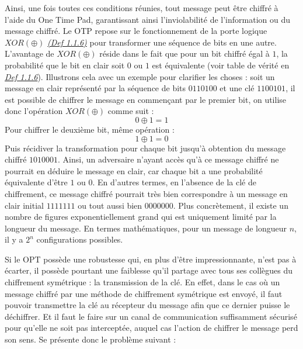 \documentclass[
  paper=a4,
  ,captions=tableheading
]{scrartcl}
\begin{document}
Ainsi, une fois toutes ces conditions réunies, tout message peut être
chiffré à l'aide du One Time Pad, garantissant ainsi l'inviolabilité de
l'information ou du message chiffré. Le OTP repose sur le fonctionnement
de la porte logique \(XOR (\oplus)\)
\emph{\href{Introduction\%20au\%20Chiffrement\%20-\%20Théories\%20et\%20Pratiques\%20du\%20Chiffrement\%20Symétrique\%20et\%20Asymétrique\%20avec\%20une\%20Étude\%20de\%20Cas\%20sur\%20l'Algorithme\%20RSA.\#Def\%201.1.6}{(Def
1.1.6)}} pour transformer une séquence de bits en une autre. L'avantage
de \(XOR (\oplus)\) réside dans le fait que pour un bit chiffré égal à
\(1\), la probabilité que le bit en clair soit \(0\) ou \(1\) est
équivalente (voir table de vérité en
\emph{\href{Introduction\%20au\%20Chiffrement\%20-\%20Théories\%20et\%20Pratiques\%20du\%20Chiffrement\%20Symétrique\%20et\%20Asymétrique\%20avec\%20une\%20Étude\%20de\%20Cas\%20sur\%20l'Algorithme\%20RSA.\#Def\%201.1.6}{Def
1.1.6}}). Illustrons cela avec un exemple pour clarifier les choses :
soit un message en clair représenté par la séquence de bits \(0110100\)
et une clé \(1100101\), il est possible de chiffrer le message en
commençant par le premier bit, on utilise donc l'opération
\(XOR (\oplus)\) comme suit : \[
0 \oplus 1 = 1
\] Pour chiffrer le deuxième bit, même opération : \[
1 \oplus 1 = 0
\] Puis récidiver la transformation pour chaque bit jusqu'à obtention du
message chiffré \(1010001\). Ainsi, un adversaire n'ayant accès qu'à ce
message chiffré ne pourrait en déduire le message en clair, car chaque
bit a une probabilité équivalente d'être \(1\) ou \(0\). En d'autres
termes, en l'absence de la clé de chiffrement, ce message chiffré
pourrait très bien correspondre à un message en clair initial
\(1111111\) ou tout aussi bien \(0000000\). 
\clearpage
Plus concrètement, il existe
un nombre de figures exponentiellement grand qui est uniquement limité
par la longueur du message. En termes mathématiques, pour un message de
longueur \(n\), il y a \(2^n\) configurations possibles.

Si le OPT possède une robustesse qui, en plus d'être impressionnante,
n'est pas à écarter, il possède pourtant une faiblesse qu'il partage
avec tous ses collègues du chiffrement symétrique : la transmission de
la clé. En effet, dans le cas où un message chiffré par une méthode de
chiffrement symétrique est envoyé, il faut pouvoir transmettre la clé au
récepteur du message afin que ce dernier puisse le déchiffrer. Et il
faut le faire sur un canal de communication suffisamment sécurisé pour
qu'elle ne soit pas interceptée, auquel cas l'action de chiffrer le
message perd son sens. Se présente donc le problème suivant :
\end{document}

